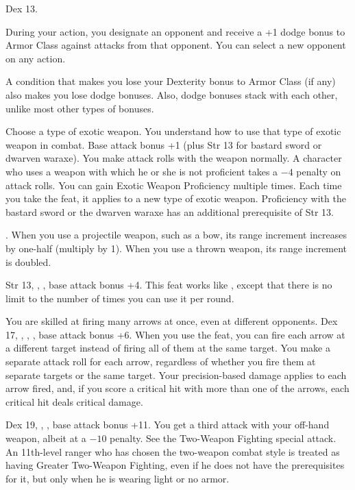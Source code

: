 {Dex 13.}
{During your action, you designate an opponent and receive a +1 dodge bonus to Armor Class against attacks from that opponent. You can select a new opponent on any action.

A condition that makes you lose your Dexterity bonus to Armor Class (if any) also makes you lose dodge bonuses. Also, dodge bonuses stack with each other, unlike most other types of bonuses.}

{Choose a type of exotic weapon. You understand how to use that type of exotic weapon in combat.}
{Base attack bonus +1 (plus Str 13 for bastard sword or dwarven waraxe).}
{You make attack rolls with the weapon normally.}
{A character who uses a weapon with which he or she is not proficient takes a $-4$ penalty on attack rolls.}
{You can gain Exotic Weapon Proficiency multiple times. Each time you take the feat, it applies to a new type of exotic weapon. Proficiency with the bastard sword or the dwarven waraxe has an additional prerequisite of Str 13.}

{.}
{When you use a projectile weapon, such as a bow, its range increment increases by one-half (multiply by 1\onehalf). When you use a thrown weapon, its range increment is doubled.}

{Str 13, , , base attack bonus +4.}
{This feat works like , except that there is no limit to the number of times you can use it per round.}

{You are skilled at firing many arrows at once, even at different opponents.}
{Dex 17, , , , base attack bonus +6.}
{When you use the  feat, you can fire each arrow at a different target instead of firing all of them at the same target. You make a separate attack roll for each arrow, regardless of whether you fire them at separate targets or the same target. Your precision-based damage applies to each arrow fired, and, if you score a critical hit with more than one of the arrows, each critical hit deals critical damage.}{}{}

{}
{Dex 19, , , base attack bonus +11.}
{You get a third attack with your off-hand weapon, albeit at a $-10$ penalty. See the Two-Weapon Fighting special attack.}{}
{An 11th-level ranger who has chosen the two-weapon combat style is treated as having Greater Two-Weapon Fighting, even if he does not have the prerequisites for it, but only when he is wearing light or no armor.}


